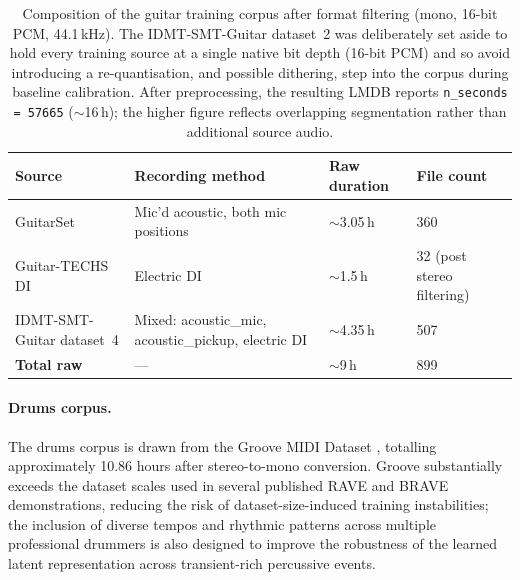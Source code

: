 \documentclass[a4paper,11pt,oneside,openany]{book}
\begin{document}
\begin{table}[H]
\centering
\caption{Composition of the guitar training corpus after format filtering (mono, 16-bit PCM, 44.1\,kHz). The IDMT-SMT-Guitar dataset~2 was deliberately set aside to hold every training source at a single native bit depth (16-bit PCM) and so avoid introducing a re-quantisation, and possible dithering, step into the corpus during baseline calibration. After preprocessing, the resulting LMDB reports \texttt{n\_seconds = 57665} ($\sim$16\,h); the higher figure reflects overlapping segmentation rather than additional source audio.}
\label{tab:guitar_corpus}
\footnotesize
\setlength{\tabcolsep}{5pt}
\begin{tabularx}{\textwidth}{@{}>{\raggedright\arraybackslash}X>{\raggedright\arraybackslash}Xll@{}}
\toprule
\textbf{Source} & \textbf{Recording method} & \textbf{Raw duration} & \textbf{File count} \\
\midrule
GuitarSet \parencite{xi2018guitarset} & Mic'd acoustic, both mic positions & $\sim$3.05\,h & 360 \\
Guitar-TECHS DI \parencite{pedroza2024guitartechs} & Electric DI & $\sim$1.5\,h & 32 (post stereo filtering) \\
IDMT-SMT-Guitar dataset~4 \parencite{kehling2014idmt} & Mixed: acoustic\_mic, acoustic\_pickup, electric DI & $\sim$4.35\,h & 507 \\
\midrule
\textbf{Total raw} & --- & $\sim$9\,h & 899 \\
\bottomrule
\end{tabularx}
\end{table}

\paragraph{Drums corpus.} The drums corpus is drawn from the Groove MIDI Dataset \parencite{gillick2019groove}, totalling approximately 10.86 hours after stereo-to-mono conversion. Groove substantially exceeds the dataset scales used in several published RAVE and BRAVE demonstrations, reducing the risk of dataset-size-induced training instabilities; the inclusion of diverse tempos and rhythmic patterns across multiple professional drummers is also designed to improve the robustness of the learned latent representation across transient-rich percussive events.
\end{document}
